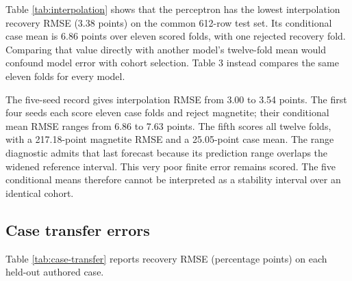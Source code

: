 \documentclass[10pt]{article}
\begin{document}
Table \ref{tab:interpolation} shows that the perceptron has the lowest interpolation recovery RMSE (3.38 points)
on the common 612-row test set. Its conditional case mean is 6.86 points
over eleven scored folds, with one rejected recovery fold. Comparing
that value directly with another model's twelve-fold mean would confound
model error with cohort selection. Table 3 instead compares the same
eleven folds for every model.

The five-seed record gives interpolation RMSE from 3.00 to 3.54 points.
The first four seeds each score eleven case folds and reject magnetite;
their conditional mean RMSE ranges from 6.86 to 7.63 points. The fifth
scores all twelve folds, with a 217.18-point magnetite RMSE and a
25.05-point case mean. The range diagnostic admits that last forecast
because its prediction range overlaps the widened reference interval.
This very poor finite error remains scored. The five conditional means
therefore cannot be interpreted as a stability interval over an
identical cohort.

\subsection{Case transfer errors}\label{case-transfer-errors}

Table \ref{tab:case-transfer} reports recovery RMSE (percentage points) on each held-out authored case.
\end{document}
